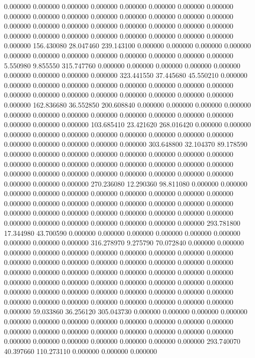 0.000000 0.000000 0.000000
0.000000 0.000000 0.000000
0.000000 0.000000 0.000000
0.000000 0.000000 0.000000
0.000000 0.000000 0.000000
0.000000 0.000000 0.000000
0.000000 0.000000 0.000000
0.000000 0.000000 0.000000
0.000000 0.000000 0.000000
0.000000 0.000000 0.000000
0.000000 0.000000 0.000000
156.430080 28.047460 239.143100
0.000000 0.000000 0.000000
0.000000 0.000000 0.000000
0.000000 0.000000 0.000000
0.000000 0.000000 0.000000
5.550980 9.855550 315.747760
0.000000 0.000000 0.000000
0.000000 0.000000 0.000000
0.000000 0.000000 0.000000
323.441550 37.445680 45.550210
0.000000 0.000000 0.000000
0.000000 0.000000 0.000000
0.000000 0.000000 0.000000
0.000000 0.000000 0.000000
0.000000 0.000000 0.000000
0.000000 0.000000 0.000000
162.836680 36.552850 200.608840
0.000000 0.000000 0.000000
0.000000 0.000000 0.000000
0.000000 0.000000 0.000000
0.000000 0.000000 0.000000
0.000000 0.000000 0.000000
103.685410 23.421620 268.016420
0.000000 0.000000 0.000000
0.000000 0.000000 0.000000
0.000000 0.000000 0.000000
0.000000 0.000000 0.000000
0.000000 0.000000 0.000000
303.648800 32.104370 89.178590
0.000000 0.000000 0.000000
0.000000 0.000000 0.000000
0.000000 0.000000 0.000000
0.000000 0.000000 0.000000
0.000000 0.000000 0.000000
0.000000 0.000000 0.000000
0.000000 0.000000 0.000000
0.000000 0.000000 0.000000
0.000000 0.000000 0.000000
270.236080 12.290360 98.811080
0.000000 0.000000 0.000000
0.000000 0.000000 0.000000
0.000000 0.000000 0.000000
0.000000 0.000000 0.000000
0.000000 0.000000 0.000000
0.000000 0.000000 0.000000
0.000000 0.000000 0.000000
0.000000 0.000000 0.000000
0.000000 0.000000 0.000000
0.000000 0.000000 0.000000
0.000000 0.000000 0.000000
293.781800 17.344980 43.700590
0.000000 0.000000 0.000000
0.000000 0.000000 0.000000
0.000000 0.000000 0.000000
316.278970 9.275790 70.072840
0.000000 0.000000 0.000000
0.000000 0.000000 0.000000
0.000000 0.000000 0.000000
0.000000 0.000000 0.000000
0.000000 0.000000 0.000000
0.000000 0.000000 0.000000
0.000000 0.000000 0.000000
0.000000 0.000000 0.000000
0.000000 0.000000 0.000000
0.000000 0.000000 0.000000
0.000000 0.000000 0.000000
0.000000 0.000000 0.000000
0.000000 0.000000 0.000000
0.000000 0.000000 0.000000
0.000000 0.000000 0.000000
0.000000 0.000000 0.000000
0.000000 0.000000 0.000000
59.033860 36.256120 305.043730
0.000000 0.000000 0.000000
0.000000 0.000000 0.000000
0.000000 0.000000 0.000000
0.000000 0.000000 0.000000
0.000000 0.000000 0.000000
0.000000 0.000000 0.000000
0.000000 0.000000 0.000000
0.000000 0.000000 0.000000
0.000000 0.000000 0.000000
293.740070 40.397660 110.273110
0.000000 0.000000 0.000000
